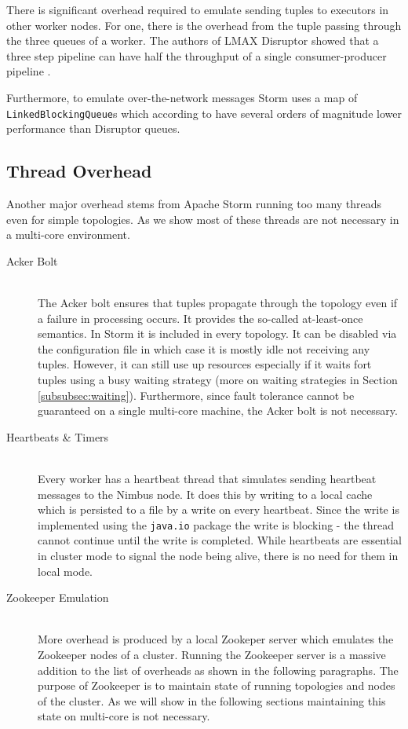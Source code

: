 \documentclass[bsc,twoside,singlespacing,normalheadings,parskip]{infthesis}\usepackage[]{graphicx}\usepackage[]{color}
\begin{document}
There is significant overhead required to emulate sending tuples to executors in other worker nodes. For one, there is the overhead from the tuple passing through the three queues of a worker. The authors of LMAX Disruptor showed that a three step pipeline can have half the throughput of a single consumer-producer pipeline \citep{DisruptorWiki}.

Furthermore, to emulate over-the-network messages Storm uses a map of \\ \texttt{LinkedBlockingQueue}s which according to \cite{Thompson_Farley_Barker_Gee_Stewart_2011} have several orders of magnitude lower performance than Disruptor queues.

\subsection{Thread Overhead}

Another major overhead stems from Apache Storm running too many threads even for simple topologies. As we show most of these threads are not necessary in a multi-core environment.

\begin{description}
	\item[Acker Bolt] \hfill \\
	The Acker bolt ensures that tuples propagate through the topology even if a failure in processing occurs. It provides the so-called at-least-once semantics. In Storm it is included in every topology. It can be disabled via the configuration file in which case it is mostly idle not receiving any tuples. However, it can still use up resources especially if it waits fort tuples using a busy waiting strategy (more on waiting strategies in Section \ref{subsubsec:waiting}). Furthermore, since fault tolerance cannot be guaranteed on a single multi-core machine, the Acker bolt is not necessary.
	\item[Heartbeats \& Timers] \hfill \\
	Every worker has a heartbeat thread that simulates sending heartbeat messages to the Nimbus node. It does this by writing to a local cache which is persisted to a file by a write on every heartbeat. Since the write is implemented using the \texttt{java.io} package the write is blocking - the thread cannot continue until the write is completed. While heartbeats are essential in cluster mode to signal the node being alive, there is no need for them in local mode.
	\item[Zookeeper Emulation] \hfill \\
	More overhead is produced by a local Zookeper server which emulates the Zookeeper nodes of a cluster. Running the Zookeeper server is a massive addition to the list of overheads as shown in the following paragraphs. The purpose of Zookeeper is to maintain state of running topologies and nodes of the cluster. As we will show in the following sections maintaining this state on multi-core is not necessary.
\end{description}
\end{document}
